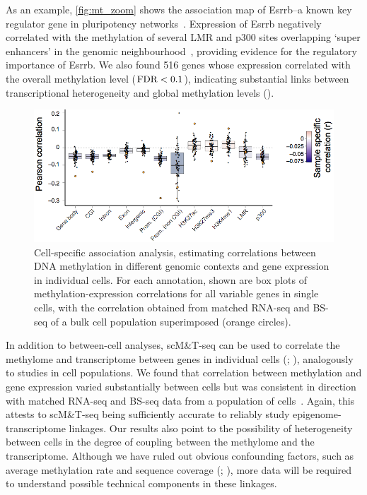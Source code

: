 As an example, \cref{fig:mt_zoom} shows the association map of Esrrb--a known key regulator gene in pluripotency networks~\citep{papp_pluripotency_2012}. Expression of Esrrb negatively correlated with the methylation of several LMR and p300 sites overlapping `super enhancers' in the genomic neighbourhood~\citep{whyte_master_2013}, providing evidence for the regulatory importance of Esrrb. We also found 516 genes whose expression correlated with the overall methylation level ($\operatorname{FDR}<0.1$), indicating substantial links between transcriptional heterogeneity and global methylation levels ().

\begin{figure}[htbp!]
\centering
\includegraphics[width=1.0\textwidth]{cell}
\caption[Cell-specific correlation analysis]{Cell-specific association analysis, estimating correlations between DNA methylation in different genomic contexts and gene expression in individual cells. For each annotation, shown are box plots of methylation-expression correlations for all variable genes in single cells, with the correlation obtained from matched RNA-seq and BS-seq of a bulk cell population superimposed (orange circles).}
\label{fig:mt_cell}
\end{figure}

In addition to between-cell analyses, scM\&T-seq can be used to correlate the methylome and transcriptome between genes in individual cells (; ), analogously to studies in cell populations. We found that correlation between methylation and gene expression varied substantially between cells but was consistent in direction with matched RNA-seq and BS-seq data from a population of cells~\citep{ficz_fgf_2013}. Again, this attests to scM\&T-seq being sufficiently accurate to reliably study epigenome-transcriptome linkages. Our results also point to the possibility of heterogeneity between cells in the degree of coupling between the methylome and the transcriptome. Although we have ruled out obvious confounding factors, such as average methylation rate and sequence coverage (; ), more data will be required to understand possible technical components in these linkages.
